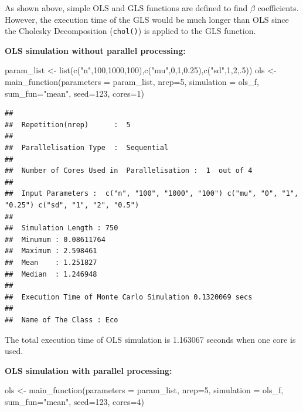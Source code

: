 \documentclass[11pt,a4paper]{article}
\newenvironment{Shaded}{\begin{snugshade}}{\end{snugshade}}
\newcommand{\AttributeTok}[1]{\textcolor[rgb]{0.77,0.63,0.00}{#1}}
\newcommand{\DecValTok}[1]{\textcolor[rgb]{0.00,0.00,0.81}{#1}}
\newcommand{\FloatTok}[1]{\textcolor[rgb]{0.00,0.00,0.81}{#1}}
\newcommand{\FunctionTok}[1]{\textcolor[rgb]{0.00,0.00,0.00}{#1}}
\newcommand{\NormalTok}[1]{#1}
\newcommand{\OtherTok}[1]{\textcolor[rgb]{0.56,0.35,0.01}{#1}}
\newcommand{\StringTok}[1]{\textcolor[rgb]{0.31,0.60,0.02}{#1}}
\begin{document}
As shown above, simple OLS and GLS functions are defined to find
\(\beta\) coefficients. However, the execution time of the GLS would be
much longer than OLS since the Cholesky Decomposition (\texttt{chol()})
is applied to the GLS function.

\textbf{OLS simulation without parallel processing:}

\begin{Shaded}
\begin{Highlighting}[]
\NormalTok{ param\_list }\OtherTok{\textless{}{-}} \FunctionTok{list}\NormalTok{(}\FunctionTok{c}\NormalTok{(}\StringTok{"n"}\NormalTok{,}\DecValTok{100}\NormalTok{,}\DecValTok{1000}\NormalTok{,}\DecValTok{100}\NormalTok{),}\FunctionTok{c}\NormalTok{(}\StringTok{"mu"}\NormalTok{,}\DecValTok{0}\NormalTok{,}\DecValTok{1}\NormalTok{,}\FloatTok{0.25}\NormalTok{),}\FunctionTok{c}\NormalTok{(}\StringTok{"sd"}\NormalTok{,}\DecValTok{1}\NormalTok{,}\DecValTok{2}\NormalTok{,.}\DecValTok{5}\NormalTok{))}
\NormalTok{ols }\OtherTok{\textless{}{-}} \FunctionTok{main\_function}\NormalTok{(}\AttributeTok{parameters =}\NormalTok{ param\_list,}
                     \AttributeTok{nrep=}\DecValTok{5}\NormalTok{,}
                     \AttributeTok{simulation =}\NormalTok{ ols\_f,}
                     \AttributeTok{sum\_fun=}\StringTok{"mean"}\NormalTok{,}
                     \AttributeTok{seed=}\DecValTok{123}\NormalTok{,}
                     \AttributeTok{cores=}\DecValTok{1}\NormalTok{)}
\end{Highlighting}
\end{Shaded}

\begin{verbatim}
## 
##  Repetition(nrep)      :  5 
## 
##  Parallelisation Type  :  Sequential 
## 
##  Number of Cores Used in  Parallelisation :  1  out of 4 
## 
##  Input Parameters :  c("n", "100", "1000", "100") c("mu", "0", "1", "0.25") c("sd", "1", "2", "0.5") 
## 
##  Simulation Length : 750 
##  Minumum : 0.08611764 
##  Maximum : 2.598461 
##  Mean    : 1.251827 
##  Median  : 1.246948 
## 
##  Execution Time of Monte Carlo Simulation 0.1320069 secs 
## 
##  Name of The Class : Eco
\end{verbatim}

The total execution time of OLS simulation is 1.163067 seconds when one
core is used.

\textbf{OLS simulation with parallel processing:}

\begin{Shaded}
\begin{Highlighting}[]
\NormalTok{ols }\OtherTok{\textless{}{-}} \FunctionTok{main\_function}\NormalTok{(}\AttributeTok{parameters =}\NormalTok{ param\_list,}
                     \AttributeTok{nrep=}\DecValTok{5}\NormalTok{,}
                     \AttributeTok{simulation =}\NormalTok{ ols\_f,}
                     \AttributeTok{sum\_fun=}\StringTok{"mean"}\NormalTok{,}
                     \AttributeTok{seed=}\DecValTok{123}\NormalTok{,}
                     \AttributeTok{cores=}\DecValTok{4}\NormalTok{)}
\end{Highlighting}
\end{Shaded}
\end{document}
